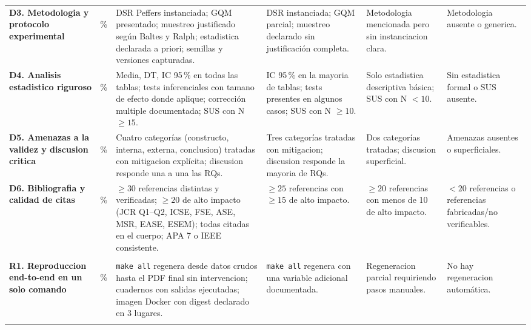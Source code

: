 \documentclass[11pt,a4paper]{article}
\begin{document}
{\begin{longtable}{|L{2.9cm}|C{0.9cm}|L{2.5cm}|L{2.5cm}|L{2.5cm}|L{2.3cm}|}
\textbf{D3. Metodologia y protocolo experimental} &
\,\% &
DSR Peffers instanciada; GQM presentado; muestreo justificado seg\'{u}n Baltes y Ralph; estadistica declarada a priori; semillas y versiones capturadas. &
DSR instanciada; GQM parcial; muestreo declarado sin justificaci\'{o}n completa. &
Metodologia mencionada pero sin instanciacion clara. &
Metodologia ausente o generica. \\

\textbf{D4. Analisis estadistico riguroso} &
\,\% &
Media, DT, IC 95\,\% en todas las tablas; tests inferenciales con tamano de efecto donde aplique; correcci\'{o}n multiple documentada; SUS con N $\geq 15$. &
IC 95\,\% en la mayoria de tablas; tests presentes en algunos casos; SUS con N $\geq 10$. &
Solo estadistica descriptiva b\'{a}sica; SUS con N $< 10$. &
Sin estadistica formal o SUS ausente. \\

\textbf{D5. Amenazas a la validez y discusion critica} &
\,\% &
Cuatro categor\'{i}as (constructo, interna, externa, conclusion) tratadas con mitigacion expl\'{i}cita; discusion responde una a una las RQs. &
Tres categor\'{i}as tratadas con mitigacion; discusion responde la mayoria de RQs. &
Dos categor\'{i}as tratadas; discusion superficial. &
Amenazas ausentes o superficiales. \\

\textbf{D6. Bibliografia y calidad de citas} &
\,\% &
$\geq 30$ referencias distintas y verificadas; $\geq 20$ de alto impacto (JCR Q1--Q2, ICSE, FSE, ASE, MSR, EASE, ESEM); todas citadas en el cuerpo; APA 7 o IEEE consistente. &
$\geq 25$ referencias con $\geq 15$ de alto impacto. &
$\geq 20$ referencias con menos de 10 de alto impacto. &
$< 20$ referencias o referencias fabricadas/no verificables. \\

\\ \hline

\textbf{R1. Reproduccion end-to-end en un solo comando} &
\,\% &
\texttt{make all} regenera desde datos crudos hasta el PDF final sin intervencion; cuadernos con salidas ejecutadas; imagen Docker con digest declarado en 3 lugares. &
\texttt{make all} regenera con una variable adicional documentada. &
Regeneracion parcial requiriendo pasos manuales. &
No hay regeneracion autom\'{a}tica. \\


\end{longtable}}
\end{document}
